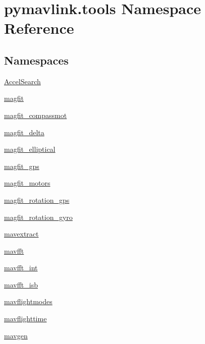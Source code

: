 \hypertarget{namespacepymavlink_1_1tools}{}\section{pymavlink.\+tools Namespace Reference}
\label{namespacepymavlink_1_1tools}
\subsection*{Namespaces}
\begin{DoxyCompactItemize}
\item 
 \mbox{\hyperlink{namespacepymavlink_1_1tools_1_1AccelSearch}{Accel\+Search}}
\item 
 \mbox{\hyperlink{namespacepymavlink_1_1tools_1_1magfit}{magfit}}
\item 
 \mbox{\hyperlink{namespacepymavlink_1_1tools_1_1magfit__compassmot}{magfit\+\_\+compassmot}}
\item 
 \mbox{\hyperlink{namespacepymavlink_1_1tools_1_1magfit__delta}{magfit\+\_\+delta}}
\item 
 \mbox{\hyperlink{namespacepymavlink_1_1tools_1_1magfit__elliptical}{magfit\+\_\+elliptical}}
\item 
 \mbox{\hyperlink{namespacepymavlink_1_1tools_1_1magfit__gps}{magfit\+\_\+gps}}
\item 
 \mbox{\hyperlink{namespacepymavlink_1_1tools_1_1magfit__motors}{magfit\+\_\+motors}}
\item 
 \mbox{\hyperlink{namespacepymavlink_1_1tools_1_1magfit__rotation__gps}{magfit\+\_\+rotation\+\_\+gps}}
\item 
 \mbox{\hyperlink{namespacepymavlink_1_1tools_1_1magfit__rotation__gyro}{magfit\+\_\+rotation\+\_\+gyro}}
\item 
 \mbox{\hyperlink{namespacepymavlink_1_1tools_1_1mavextract}{mavextract}}
\item 
 \mbox{\hyperlink{namespacepymavlink_1_1tools_1_1mavfft}{mavfft}}
\item 
 \mbox{\hyperlink{namespacepymavlink_1_1tools_1_1mavfft__int}{mavfft\+\_\+int}}
\item 
 \mbox{\hyperlink{namespacepymavlink_1_1tools_1_1mavfft__isb}{mavfft\+\_\+isb}}
\item 
 \mbox{\hyperlink{namespacepymavlink_1_1tools_1_1mavflightmodes}{mavflightmodes}}
\item 
 \mbox{\hyperlink{namespacepymavlink_1_1tools_1_1mavflighttime}{mavflighttime}}
\item 
 \mbox{\hyperlink{namespacepymavlink_1_1tools_1_1mavgen}{mavgen}}

\end{DoxyCompactItemize}
